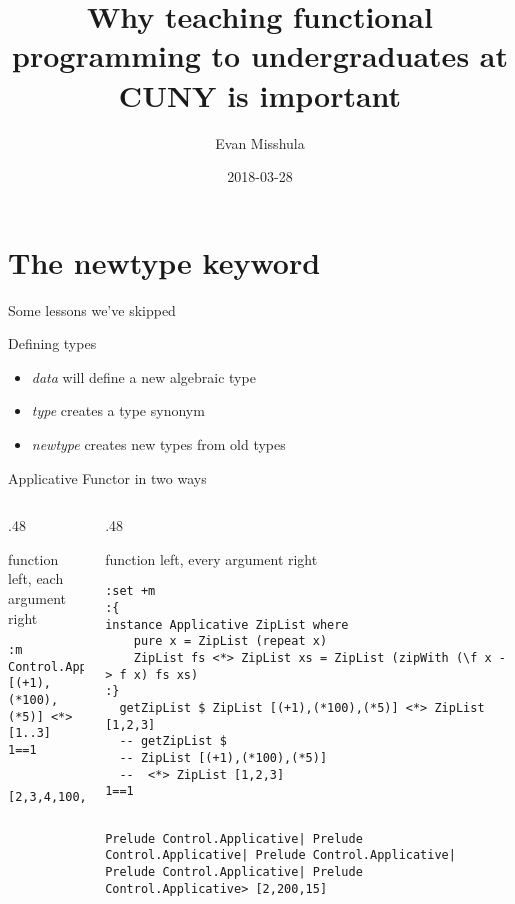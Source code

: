 \documentclass[presetation]{beamer}
\author{Evan Misshula}
\date{2018-03-28}
\title{Why teaching functional programming to undergraduates at CUNY is important}
\begin{document}
\maketitle

\section{The newtype keyword}
\label{sec:org8d1fc5a}
\begin{frame}[label={sec:org620bd4c}]{Some lessons we've skipped}
\begin{block}{Defining types}
\begin{itemize}
\item \emph{data} will define a new algebraic type
\item \emph{type} creates a type synonym
\item \emph{newtype} creates new types from old types
\end{itemize}
\end{block}
\end{frame}

\begin{frame}[fragile,label={sec:org6f749a0}]{Applicative Functor in two ways}
 \begin{columns}
\begin{column}{.48\columnwidth}
\begin{block}{function left, each argument right}
\begin{verbatim}
:m Control.Applicative
[(+1),(*100),(*5)] <*> [1..3]
1==1
\end{verbatim}

\begin{verbatim}

[2,3,4,100,200,300,5,10,15]
\end{verbatim}
\end{block}
\end{column}

\begin{column}{.48\columnwidth}
\begin{block}{function left, every argument right}
\begin{verbatim}
:set +m
:{
instance Applicative ZipList where  
	pure x = ZipList (repeat x)  
	ZipList fs <*> ZipList xs = ZipList (zipWith (\f x -> f x) fs xs)  
:}
  getZipList $ ZipList [(+1),(*100),(*5)] <*> ZipList [1,2,3]
  -- getZipList $
  -- ZipList [(+1),(*100),(*5)]
  --  <*> ZipList [1,2,3]
1==1
\end{verbatim}

\begin{verbatim}

Prelude Control.Applicative| Prelude Control.Applicative| Prelude Control.Applicative| Prelude Control.Applicative| Prelude Control.Applicative> [2,200,15]
\end{verbatim}
\end{block}
\end{column}
\end{columns}
\end{frame}
\end{document}
